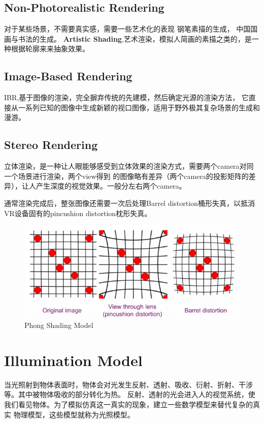 \section{Non-Photorealistic Rendering}
对于某些场景，不需要真实感，需要一些艺术化的表现
钢笔素描的生成，
中国国画与书法的生成。
\newline
\textbf{Artistic Shading},艺术渲染，模拟人简画的素描之类的，是一种根据轮廓来来抽象效果。

\section{Image-Based Rendering}

IBR,基于图像的渲染，完全摒弃传统的先建模，然后确定光源的渲染方法，
它直接从一系列已知的图像中生成新颖的视口图像，适用于野外极其复杂场景的生成和漫游。

\section{Stereo Rendering}
立体渲染，是一种让人眼能够感受到立体效果的渲染方式，需要两个camera对同一个场景进行渲染，两个view得到
的图像略有差异（两个camera的投影矩阵的差异），让人产生深度的视觉效果。一般分左右两个camera。

通常渲染完成后，整张图像还需要一次后处理Barrel distortion桶形失真，以抵消VR设备固有的pincushion distortion枕形失真。
\begin{figure}[h]
    \centering
    \includegraphics[width=\textwidth]{images/Optimising-OpenGL-ES-for-mobile-VR-lens-distortion.png}
    \caption{Phong Shading Model}
\end{figure}

\chapter{Illumination Model}

当光照射到物体表面时，物体会对光发生反射、透射、吸收、衍射、折射、干涉等。其中被物体吸收的部分转化为热。
反射、透射的光会进入人的视觉系统，使我们看见物体。为了模拟仿真这一真实的现象，建立一些数学模型来替代复杂的真实
物理模型，这些模型就称为光照模型。


